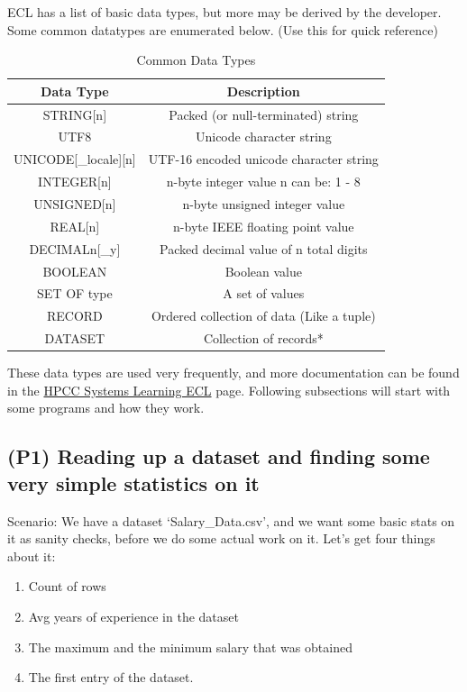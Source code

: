 \documentclass[a4paper,oneside,12pt]{book}
\begin{document}
ECL has a list of basic data types, but more may be derived by the developer.
Some common datatypes are enumerated below. (Use this for quick reference)
\begin{table}[h]
\centering
\begin{tabular}{|c|c|}\hline
Data Type & Description \\\hline\hline
STRING[n] & Packed (or null-terminated) string \\
UTF8 & Unicode character string \\
UNICODE[\_locale][n] &  UTF-16 encoded unicode character string \\
INTEGER[n] & n-byte integer value n can be: 1 - 8 \\
UNSIGNED[n] & n-byte unsigned integer value \\
REAL[n] & n-byte IEEE floating point value \\
DECIMAL\textlangle{}n\textrangle{}[\_y] & Packed decimal value of n total digits \\
BOOLEAN & Boolean value \\
SET OF \textlangle{}type\textrangle{} & A set of values\\
RECORD & Ordered collection of data (Like a tuple)\\
DATASET & Collection of records* \\\hline
\end{tabular}
\caption{Common Data Types}
\end{table}

These data types are used very frequently, and more documentation can be found in the \href{https://hpccsystems.com/training/documentation/learning-ecl}{HPCC Systems Learning ECL} page. Following subsections will start with some programs and how they work.

\subsection[Simple Statistics on Datasets]{(P1) Reading up a dataset and finding some very simple statistics on it}

Scenario: We have a dataset `Salary\_Data.csv', and we want some basic stats on it as sanity checks, before we do some actual work on it. Let's get four things about it:

\begin{enumerate}
    \item Count of rows
    \item Avg years of experience in the dataset
    \item The maximum and the minimum salary that was obtained
    \item The first entry of the dataset.
\end{enumerate}
\end{document}
